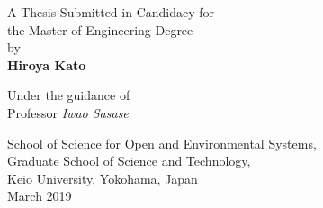\pagestyle{empty}
\begin{center}

\vspace{1cm}
\setlength{\textwidth}{2zw}
\Large
{\bf \PAPERTITLE}

\vspace{2cm}

A Thesis Submitted in Candidacy for \\
the Master of Engineering Degree \\
by \\
{\bf Hiroya Kato}\\[.1in]

\vspace{1cm}

Under the guidance of
\\Professor {\it Iwao Sasase}\\

\vspace{1cm}

School of Science for Open and Environmental Systems, \\
Graduate School of Science and Technology, \\
Keio University, Yokohama, Japan \\
March 2019

\end{center}

